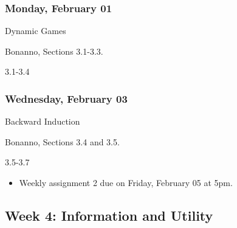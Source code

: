 \documentclass[
]{article}
\providecommand{\tightlist}{%
  \setlength{\itemsep}{0pt}\setlength{\parskip}{0pt}}
\begin{document}
\begin{multicols}{2}

\hypertarget{monday-february-01}{%
\subsubsection{Monday, February 01}\label{monday-february-01}}

\begin{description}
\tightlist
\item[Topic]
Dynamic Games
\item[Reading]
Bonanno, Sections 3.1-3.3.
\item[Lectures]
3.1-3.4
\end{description}

\hypertarget{wednesday-february-03}{%
\subsubsection{Wednesday, February 03}\label{wednesday-february-03}}

\begin{description}
\tightlist
\item[Topic]
Backward Induction
\item[Reading]
Bonanno, Sections 3.4 and 3.5.
\item[Lectures]
3.5-3.7
\end{description}

\end{multicols}

\begin{itemize}
\tightlist
\item
  Weekly assignment 2 due on Friday, February 05 at 5pm.
\end{itemize}

\hypertarget{week-4-information-and-utility}{%
\subsection{Week 4: Information and
Utility}\label{week-4-information-and-utility}}
\end{document}
